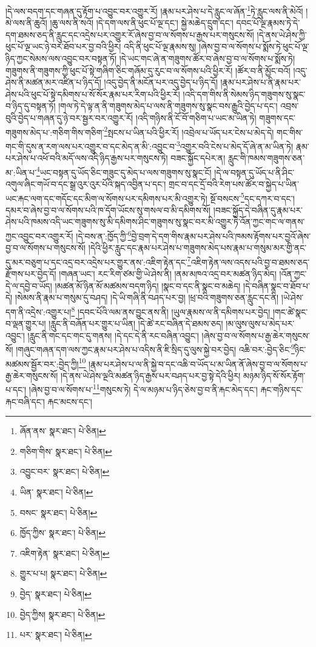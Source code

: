 །དེ་ལས་བདག་དང་གཞན་དུ་རྟོག་པ་འབྱུང་བར་འགྱུར་རོ། །རྣམ་པར་ཤེས་པ་དེ་རླུང་ལ་ཞོན་\footnote{ཞོན་ནས་  སྣར་ཐང་།  པེ་ཅིན། }ཏེ་རླུང་ལས་ནི་མེའོ། །
མེ་ལས་ནི་ཆུའོ། །ཆུ་ལས་ནི་སའོ། །དེ་དག་ལས་ནི་ཕུང་པོ་ལྔ་དང་། སྐྱེ་མཆེད་དྲུག་དང་། དབང་པོ་ལྔ་རྣམས་ཏེ་དེ་དག་ཐམས་ཅད་ནི་རླུང་དང་འདྲེས་པར་འགྱུར་རོ་ཞེས་བྱ་བ་ལ་སོགས་པ་རྒྱས་པར་གསུངས་སོ། །དེ་ནས་ཡེ་ཤེས་ཀྱི་ཕུང་པོ་ལྔ་ཡང་ཉེ་བར་ཐོབ་པར་བྱ་བའི་ཕྱིར། འདི་ནི་ཕུང་པོ་ལྔ་རྣམས་སུ། །ཞེས་བྱ་བ་ལ་སོགས་པ་སྨོས་ཏེ་ཕུང་པོ་ལྔ་ཉིད་ཀྱང་སེམས་ལས་འབྱུང་བར་བསྟན་ཏོ། །དེ་ཡང་གང་ཞེ་ན་གཟུགས་ཚོར་བ་ཞེས་བྱ་བ་ལ་སོགས་པ་སྨོས་ཏེ། གཟུགས་ནི་གཟུགས་ཀྱི་ཕུང་པོ་སྟེ་གཞིག་ཅིང་གཞོམ་དུ་རུང་བ་ལ་སོགས་པའི་ཕྱིར་རོ། །ཚོར་བ་ནི་མྱོང་བའོ། །འདུ་ཤེས་ནི་མཚན་མར་འཛིན་པ་ཉིད་དོ། །འདུ་བྱེད་ནི་མངོན་པར་འདུ་བྱེད་པ་ཉིད་དོ། །རྣམ་པར་ཤེས་པ་ནི་རྣམ་པར་ཤེས་པའི་ཕུང་པོ་སྟེ་དམིགས་པ་སོ་སོར་རྣམ་པར་རིག་པའི་ཕྱིར་རོ། །འདི་དག་གིས་ནི་སེམས་ཉིད་གཟུགས་སུ་སྣང་བ་ཉིད་དུ་བསྟན་ཏོ། །གལ་ཏེ་དེ་ལྟ་ན་ནི་གཟུགས་མེད་པ་ལས་ནི་གཟུགས་སུ་སྣང་བས་རྒྱུའི་བྱེད་པ་དང་། འབྲས་བུའི་བྱེད་པ་གཞན་དུ་ཉེ་བར་སྦྱར་བར་འགྱུར་རོ། །འདི་གཉིས་ནི་ངོ་བོ་གཅིག་པ་ཡང་མ་ཡིན་ཏེ། གཟུགས་དང་གཟུགས་མེད་པ་:གཅིག་གིས་གཅིག་\footnote{གཅིག་གིས་  སྣར་ཐང་།  པེ་ཅིན། }སྤངས་པ་ཡིན་པའི་ཕྱིར་རོ། །འབྲེལ་པ་ཡོད་པར་ངེས་པ་མེད་དེ། གང་གིས་གང་གི་དུས་ན་རག་ལས་པར་འགྱུར་བ་དང་མེད་ན་མི་:འབྱུང་བ་\footnote{འབྱུང་བར་  སྣར་ཐང་།  པེ་ཅིན། }འགྱུར་བའི་ངེས་པ་མེད་དོ་ཞེ་ན་མ་ཡིན་ཏེ། རྣམ་པར་ཤེས་པ་འཕོ་བའི་མདོ་ལས་འདི་ཉིད་རྒྱས་པར་གསུངས་ཏེ། བཟང་སྐྱོང་དཔེར་ན། རླུང་གི་ཁམས་གཟུགས་ཅན་མ་:ཡིན་པ་\footnote{ཡིན་  སྣར་ཐང་།  པེ་ཅིན། }ཡང་བསྟན་དུ་ཡོད་ཅིང་གཟུང་དུ་མེད་པ་ལས་གཟུགས་སུ་སྣང་ངོ། །དེ་ལ་བསྟན་དུ་ཡོད་པ་ནི་ཤིང་འགུལ་ཞིང་གཡོ་བ་དང་སྒྲ་འུར་འུར་པོའི་སྐད་འབྱིན་པ་དང་། གྲང་བ་དང་དྲོ་བའི་རེག་པས་ཚོར་བ་སྐྱེད་པ་ཡིན་ཡང་རྐང་ལག་དང་གདོང་དང་མིག་ལ་སོགས་པར་དམིགས་པར་མི་འགྱུར་ཏེ། སྔོ་བསངས་\footnote{བསང་  སྣར་ཐང་།  པེ་ཅིན། }དང་དཀར་བ་དང་། དམར་བ་ཞེས་བྱ་བ་ལ་སོགས་པའི་ཁ་དོག་ཡོངས་སུ་གསལ་བ་མི་དམིགས་སོ། །བཟང་སྐྱོད་དེ་བཞིན་དུ་རྣམ་པར་ཤེས་པའི་ཁམས་འདི་ཡང་གཟུགས་སུ་མི་དམིགས་ཤིང་གཟུགས་སུ་སྣང་བར་མི་འགྱུར་ཏེ་འོན་ཀྱང་གང་ལ་གནས་ཀྱང་འབྱུང་བར་འགྱུར་རོ། །དེ་བས་ན་:ཁྱོད་ཀྱི་\footnote{ཁྱོད་ཀྱིས་  སྣར་ཐང་།  པེ་ཅིན། }བྱེ་བྲག་དེ་དག་གིས་རྣམ་པར་ཤེས་པའི་ཁམས་རྟོགས་པར་བྱའོ་ཞེས་བྱ་བ་ལ་སོགས་པ་གསུངས་སོ། །དེའི་ཕྱིར་རླུང་དང་རྣམ་པར་ཤེས་པ་གཟུགས་མེད་པས་རྣམ་པ་གསུམ་མར་གྱི་ནང་དུ་མར་བཅུག་པ་དང་འདྲ་བར་འདྲེས་པར་གྱུར་ནས་:འཇིག་རྟེན་དང་\footnote{འཇིག་རྟེན་  སྣར་ཐང་།  པེ་ཅིན། }འཇིག་རྟེན་ལས་འདས་པའི་བྱ་བ་ཐམས་ཅད་རྫོགས་པར་བྱེད་དོ། །གཞན་ཡང་། རང་རིག་ཙམ་གྱི་ཡེ་ཤེས་ནི། །ནམ་མཁའ་འདྲ་བར་མཚན་ཉིད་མེད། །འོན་ཀྱང་དེ་ལ་དབྱེ་བ་ཡོད། །མཚན་མོ་ཉིན་མོ་མཚམས་བདག་ཉིད། །སྣང་བ་དང་ནི་སྣང་བ་མཆེད། །དེ་བཞིན་སྣང་བ་ཐོབ་པ་དེ། །སེམས་ནི་རྣམ་པ་གསུམ་དུ་བཤད། །དེ་ཡི་གཞི་ནི་བཤད་པར་བྱ། །ཕྲ་བའི་གཟུགས་ཅན་རླུང་དང་ནི། །ཡེ་ཤེས་དག་ནི་འདྲེས་:འགྱུར་པ།\footnote{གྱུར་པ་པ།  སྣར་ཐང་།  པེ་ཅིན། } །དབང་པོའི་ལམ་ནས་བྱུང་ནས་ནི། །ཡུལ་རྣམས་ལ་ནི་དམིགས་པར་བྱེད། །གང་ཚེ་སྣང་བ་ལྡན་གྱུར་པ། །རླུང་ནི་བཞོན་པར་གྱུར་པ་ཡིན། །དེ་ཚེ་རང་བཞིན་དེ་ཐམས་ཅད། །མ་ལུས་ལུས་པ་མེད་པར་འབྱུང་། །རླུང་ནི་གང་དང་གང་དུ་གནས། །དེ་དང་དེ་ནི་རང་བཞིན་འབྱུང་། །ཞེས་བྱ་བ་ལ་སོགས་པ་རྒྱ་ཆེར་གསུངས་སོ། །གཞུང་གཞན་དག་ལས་ཀྱང་རྣམ་པར་ཤེས་པ་འདིས་ནི་ཇི་སྲིད་དུ་ལུས་སྐྱེ་བར་བྱེད། འཆི་བར་:བྱེད་ཅིང་\footnote{བྱེད་  སྣར་ཐང་།  པེ་ཅིན། }ཉིང་མཚམས་སྦྱོར་བར་:བྱེད་ཀྱི།\footnote{བྱེད་ཀྱིས།  སྣར་ཐང་།  པེ་ཅིན། } །རྣམ་པར་ཤེས་པ་ལ་ནི་སྐྱེ་བ་དང་འཆི་བ་ཡོད་པ་མ་ཡིན་ནོ་ཞེས་བྱ་བ་ལ་སོགས་པ་རྒྱ་ཆེར་གསུངས་སོ། །དེ་ནས་ཡེ་ཤེས་ལྔའི་མཚན་ཉིད་རྒྱས་པར་བཤད་པར་བྱ་སྟེ་དེའི་ཕྱིར། མཉམ་ཉིད་སོ་སོར་རྟོག་པ་དང་། །ཞེས་བྱ་བ་ལ་སོགས་པ་\footnote{པར་  སྣར་ཐང་།  པེ་ཅིན། }གསུངས་ཏེ། དེ་ལ་མཉམ་པ་ཉིད་ཅེས་བྱ་བ་ནི་རྐང་མེད་དང་། རྐང་གཉིས་དང་རྐང་བཞི་དང་། རྐང་མངས་དང་། 
